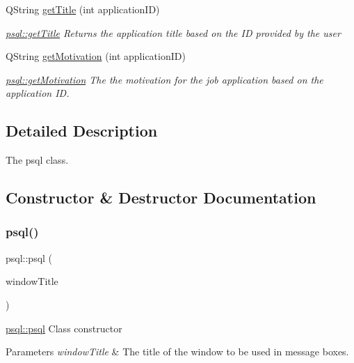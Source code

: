 \begin{DoxyCompactItemize}
Q\+String \mbox{\hyperlink{classpsql_ada9e3be3e0866011edf53e30ec510afc}{get\+Title}} (int application\+ID)
\begin{DoxyCompactList}\small\item\em \mbox{\hyperlink{classpsql_ada9e3be3e0866011edf53e30ec510afc}{psql\+::get\+Title}} Returns the application title based on the ID provided by the user \end{DoxyCompactList}\item 
Q\+String \mbox{\hyperlink{classpsql_aca1b2273937491e113089c1547caf49b}{get\+Motivation}} (int application\+ID)
\begin{DoxyCompactList}\small\item\em \mbox{\hyperlink{classpsql_aca1b2273937491e113089c1547caf49b}{psql\+::get\+Motivation}} The the motivation for the job application based on the application ID. \end{DoxyCompactList}\end{DoxyCompactItemize}


\subsection{Detailed Description}
The psql class. 

\subsection{Constructor \& Destructor Documentation}
\mbox{\label{classpsql_aaff5fe0931dce097850982e44e6361af}} 
\subsubsection{\texorpdfstring{psql()}{psql()}}
{\footnotesize\ttfamily psql\+::psql (\begin{DoxyParamCaption}\item[{Q\+String}]{window\+Title }\end{DoxyParamCaption})}



\mbox{\hyperlink{classpsql_aaff5fe0931dce097850982e44e6361af}{psql\+::psql}} Class constructor 


\begin{DoxyParams}{Parameters}
{\em window\+Title} & The title of the window to be used in message boxes. \\
\hline
\end{DoxyParams}


